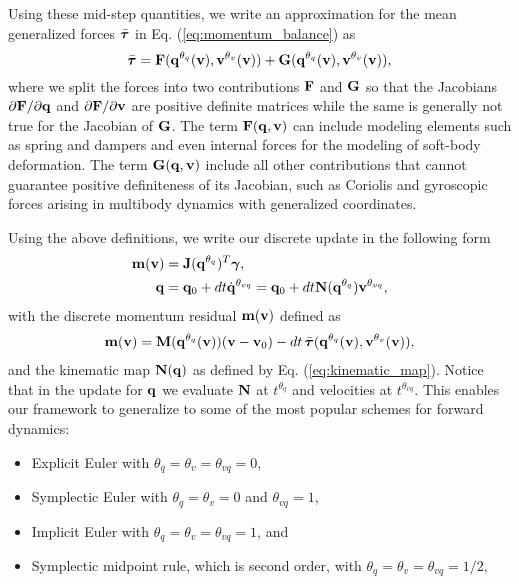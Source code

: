 Using these mid-step quantities, we write an approximation for the mean
generalized forces $\bar{{\bm{\tau}}}$ in Eq. (\ref{eq:momentum_balance}) as
\begin{equation}
	\bar{{\bm{\tau}}} = {\mathbf{F}}({\mathbf{q}}^{\theta_{q}}({\mathbf{v}}), {\mathbf{v}}^{\theta_v}({\mathbf{v}}))+
	{\mathbf{G}}({\mathbf{q}}^{\theta_{q}}({\mathbf{v}}), {\mathbf{v}}^{\theta_v}({\mathbf{v}})),
\end{equation}
where we split the forces into two contributions ${\mathbf{F}}$ and ${\mathbf{G}}$ so that
the Jacobians $\partial {\mathbf{F}}/\partial{\mathbf{q}}$ and $\partial
{\mathbf{F}}/\partial{\mathbf{v}}$ are positive definite matrices while the same is
generally not true for the Jacobian of ${\mathbf{G}}$. The term ${\mathbf{F}}({\mathbf{q}},
{\mathbf{v}})$ can include modeling elements such as spring and dampers and even
internal forces for the modeling of soft-body deformation. The term
${\mathbf{G}}({\mathbf{q}}, {\mathbf{v}})$ include all other contributions that cannot guarantee
positive definiteness of its Jacobian, such as Coriolis and gyroscopic forces
arising in multibody dynamics with generalized coordinates.

Using the above definitions, we write our discrete update in the following form
\begin{align}
	\mf{m}(\mf{v}) &= \mf{J}(\mf{q}^{\theta_{q}})^T\mf{\bgamma},
	\label{eq:v_update}\\
	\mf{q} &= \mf{q}_0 + dt \dot{\mf{q}}^{\theta_{vq}} = \mf{q}_0 + dt\mf{N}(\mf{q}^{\theta_{q}})\mf{v}^{\theta_{vq}},
	\label{eq:q_update}
\end{align}
with the discrete momentum residual ${\mathbf{m}}({\mathbf{v}})$ defined as
\begin{multline}
	\mf{m}(\mf{v}) =
	\mf{M}(\mf{q}^{\theta_{q}}(\mf{v}))(\mf{v}-\mf{v}_0) -
	dt\,\bar{\vf{\tau}}(\mf{q}^{\theta_{q}}(\mf{v}), \mf{v}^{\theta_v}(\mf{v})),
	\label{eq:m_definition}
\end{multline}
and the kinematic map ${\mathbf{N}}({\mathbf{q}})$ as defined by Eq.
(\ref{eq:kinematic_map}). Notice that in the update for ${\mathbf{q}}$ we evaluate
${\mathbf{N}}$ at $t^{\theta_{q}}$ and velocities at $t^{\theta_{vq}}$. This enables
our framework to generalize to some of the most popular schemes for forward
dynamics:
\begin{itemize}
	\item Explicit Euler with $\theta_q=\theta_{v}=\theta_{vq} = 0$,
	\item Symplectic Euler with $\theta_{q} = \theta_v = 0$ and $\theta_{vq}=1$,
	\item Implicit Euler with $\theta_{q} = \theta_v = \theta_{vq}= 1$, and
	\item Symplectic midpoint rule, which is second order, with $\theta_{q} =
	\theta_v = \theta_{vq}= 1/2$,
\end{itemize}

